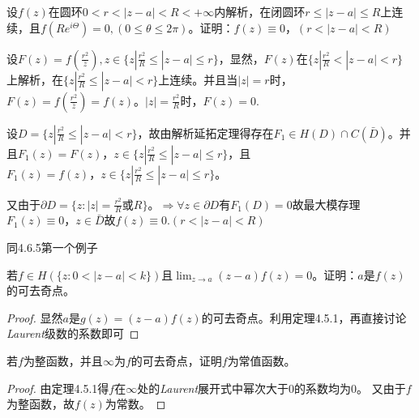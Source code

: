 \begin{eg}
	\color{blue}设$f(z)$在圆环$0<r<|z-a|<R<+\infty$内解析，在闭圆环$r\le |z-a|\le R$上连续，且$f(Re^{i\Theta} )=0,(0\le \theta \le 2\pi)$。证明：$f(z)\equiv 0，(r<|z-a|<R)$
	\color{black}
	\begin{jie}{1}
		
		
		设$F(z)=f(\frac{r^{2}}{\bar{z}}),z\in \{z|\frac{r^{2}}{R} \le |z-a|\le r\}$，显然，$F(z)$在$\{z|\frac{r^{2}}{R} < |z-a|< r\}$
		上解析，在$\{z|\frac{r^{2}}{R} \le |z-a|< r\}$上连续。并且当$|z|=r$时，$F(z)=f(\frac{r^{2}}{\bar{z}})=f(z)$。$|z|=\frac{r^{2}}{R}$时，$F(z)=0$.
		
		设$D=\{z|\frac{r^{2}}{R} \le |z-a| < r\}$，故由解析延拓定理得存在$F_{1}\in H(D)\cap C(\bar{D})$。并且$F_{1}(z)=F(z)，z\in \{z|\frac{r^{2}}{R} \le |z-a|\le r\}$，且$F_{1}(z)=f(z)，z\in \{z|\frac{r^{2}}{R} \le |z-a|\le r\}$。
		
		又由于$\partial D =\{ z:|z|=\frac{r^{2}}{R} $或$R\}$。$\Rightarrow \forall z \in \partial D$有$F_{1}(D)=0$故最大模存理$F_{1}(z)\equiv 0 ，z\in \bar{D}$故$f(z)\equiv 0.(r<|z-a|<R)$
	\end{jie}
	\begin{jie}{2}
		
		
		同4.6.5第一个例子
	\end{jie}
\end{eg}
\begin{eg}
	\color{blue}若$f\in H(\{ z:0<|z-a|<k\}  )$且$\displaystyle\lim_{z \rightarrow a}(z-a)f(z)=0$。证明：$a$是$f(z)$的可去奇点。
	
	\color{black}
	\begin{proof}
		显然$a$是$g(z)=(z-a)f(z)$的可去奇点。利用定理4.5.1，再直接讨论\emph{Laurent}级数的系数即可
	\end{proof}
	
\end{eg}
\begin{eg}
	\color{blue}若$f$为整函数，并且$\infty$为$f$的可去奇点，证明$f$为常值函数。
	
	\color{black}
	\begin{proof}
		由定理4.5.1得$f$在$\infty$处的\emph{Laurent}展开式中幂次大于0的系数均为0。
		又由于$f$为整函数，故$f(z)$为常数。
	\end{proof}
\end{eg}
